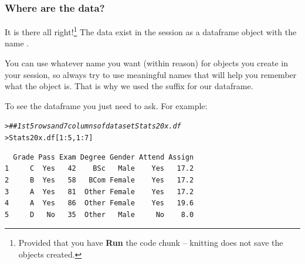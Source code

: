 \documentclass{beamer}\usepackage[]{graphicx}\usepackage[]{xcolor}
\makeatletter
\newcommand{\hlnum}[1]{\textcolor[rgb]{0.686,0.059,0.569}{#1}}%
\newcommand{\hlcom}[1]{\textcolor[rgb]{0.678,0.584,0.686}{\textit{#1}}}%
\newcommand{\hlopt}[1]{\textcolor[rgb]{0,0,0}{#1}}%
\newcommand{\hlstd}[1]{\textcolor[rgb]{0.345,0.345,0.345}{#1}}%
\newenvironment{kframe}{%
 \def\at@end@of@kframe{}%
 \ifinner\ifhmode%
  \def\at@end@of@kframe{\end{minipage}}%
  \begin{minipage}{\columnwidth}%
 \fi\fi%
 \def\FrameCommand##1{\hskip\@totalleftmargin \hskip-\fboxsep
 \colorbox{shadecolor}{##1}\hskip-\fboxsep
     \hskip-\linewidth \hskip-\@totalleftmargin \hskip\columnwidth}%
 \MakeFramed {\advance\hsize-\width
   \@totalleftmargin\z@ \linewidth\hsize
   \@setminipage}}%
 {\par\unskip\endMakeFramed%
 \at@end@of@kframe}
\newenvironment{knitrout}{}{} %
\makeatother
\begin{document}
\begin{frame}[fragile]
\frametitle{Where are the data?}

It is there all right!\footnote{Provided that you have {\bf Run} the code chunk -- knitting does not save the objects created.} 
The data exist in the  session as a dataframe object with the name . 

You can use whatever name you want (within reason) for objects you create in your  session, so always try to use meaningful names that will help you remember what the object is. That is why we used the  suffix for our dataframe.

To see the dataframe you just need to ask. For example:
\begin{knitrout}\scriptsize
{}\color{fgcolor}\begin{kframe}
\begin{alltt}
\hlstd{> }\hlcom{## 1st 5 rows and 7 columns of data set Stats20x.df}
\hlstd{> }\hlstd{Stats20x.df[}\hlnum{1}\hlopt{:}\hlnum{5}\hlstd{,}\hlnum{1}\hlopt{:}\hlnum{7}\hlstd{]}
\end{alltt}
\begin{verbatim}
  Grade Pass Exam Degree Gender Attend Assign
1     C  Yes   42    BSc   Male    Yes   17.2
2     B  Yes   58   BCom Female    Yes   17.2
3     A  Yes   81  Other Female    Yes   17.2
4     A  Yes   86  Other Female    Yes   19.6
5     D   No   35  Other   Male     No    8.0
\end{verbatim}
\end{kframe}
\end{knitrout}

\end{frame}
\end{document}
